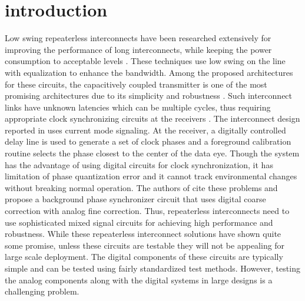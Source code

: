 \documentclass[conference]{IEEEtran}
\begin{document}
\section{introduction}
Low swing repeaterless interconnects have been researched extensively
for improving the performance of long interconnects, while
keeping the power consumption to acceptable levels 
\cite{Mensink-isscc-2007,RHo-isscc-2007,kim-jssc2010,Lee-jssc14}.
These techniques use low swing on the line with 
equalization to enhance the bandwidth. 
Among the proposed architectures 
for these circuits, the capacitively coupled transmitter is 
one of the most promising
architectures due to its simplicity and robustness 
\cite{RHo-jssc-2008,Mensink-jssc-2010,naveen_vlsi13}.
Such interconnect links
have unknown latencies which can be multiple cycles, thus
requiring appropriate clock synchronizing circuits at the receivers
\cite{Lee-jssc14}. The interconnect design reported in \cite{Lee-jssc14}
uses current mode signaling. At the receiver, a digitally controlled
delay line is 
used to generate a set of clock phases and a foreground calibration
routine selects the phase closest to the center of the data eye. 
Though the system has the advantage of using digital circuits for
clock synchronization,
it has limitation of phase quantization error and it cannot 
track environmental changes without breaking normal operation. The 
authors of \cite{naveen-arxiv15} cite these problems and propose
a background phase synchronizer circuit that uses digital coarse 
correction with analog fine correction.
Thus, repeaterless interconnects need to use sophisticated
mixed signal circuits for achieving high performance and robustness. 
While these repeaterless interconnect solutions have shown
quite some promise, unless these circuits are testable they will
not be appealing for large scale deployment. The digital components of 
these circuits are typically simple and can be tested using fairly 
standardized test methods. However, testing the analog components
along with the digital systems in large designs is a
challenging problem.
\end{document}

